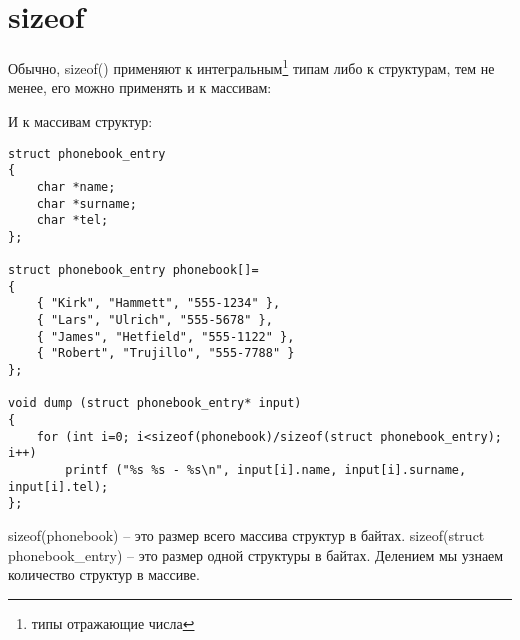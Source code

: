 ﻿\section{sizeof}


Обычно, sizeof() применяют к интегральным\footnote{типы отражающие числа} типам либо к структурам, тем не менее,
его можно применять и к массивам:


И к массивам структур:

\begin{lstlisting}
struct phonebook_entry
{
	char *name;
	char *surname;
	char *tel;
};

struct phonebook_entry phonebook[]=
{
	{ "Kirk", "Hammett", "555-1234" },
	{ "Lars", "Ulrich", "555-5678" },
	{ "James", "Hetfield", "555-1122" },
	{ "Robert", "Trujillo", "555-7788" }
};

void dump (struct phonebook_entry* input)
{
	for (int i=0; i<sizeof(phonebook)/sizeof(struct phonebook_entry); i++)
		printf ("%s %s - %s\n", input[i].name, input[i].surname, input[i].tel);
};
\end{lstlisting}

sizeof(phonebook) -- это размер всего массива структур в байтах. sizeof(struct phonebook\_entry) -- это размер
одной структуры в байтах. Делением мы узнаем количество структур в массиве.

